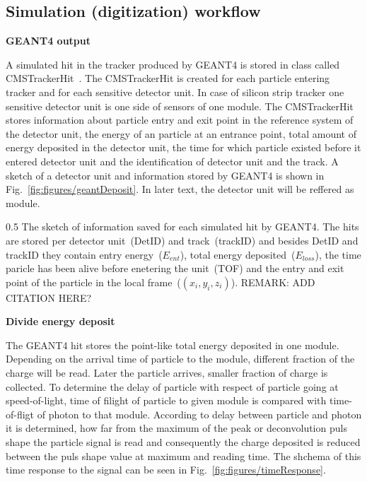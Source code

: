 \subsection{Simulation (digitization) workflow}


\textbf{GEANT4 output}

A simulated hit in the tracker produced by GEANT4 is stored in class called CMSTrackerHit~\cite{Lefebure:1364020}. The CMSTrackerHit is created for each particle entering tracker and for each sensitive detector unit. In case of silicon strip tracker one sensitive detector unit is one side of sensors of one module. The CMSTrackerHit stores information about particle entry and exit point in the reference system of the detector unit, the energy of an particle at an entrance point, total amount of energy deposited in the detector unit, the time for which particle existed before it entered detector unit and the identification of detector unit and the track. A sketch of a detector unit and information stored by GEANT4 is shown in Fig.~\ref{fig:figures/geantDeposit}. In later text, the detector unit will be reffered as module.

                 {0.5}       %
                 { The sketch of information saved for each simulated hit by GEANT4. The hits are stored per detector unit~(DetID) and track~(trackID) and besides DetID and trackID they contain entry energy~($E_{ent}$), total energy deposited~($E_{loss}$), the time paricle has been alive before enetering the unit~(TOF) and the entry and exit point of the particle in the local frame~($(x_{i},y_{i},z_{i})$). REMARK: ADD CITATION HERE?}

\textbf{Divide energy deposit}

The GEANT4 hit stores the point-like total energy deposited in one module. Depending on the arrival time of particle to the module, different fraction of the charge will be read. Later the particle arrives, smaller fraction of charge is collected. To determine the delay of particle with respect of particle going at speed-of-light, time of filight of particle to given module is compared with time-of-fligt of photon to that module. According to delay between particle and photon it is determined, how far from the maximum of the  peak or deconvolution puls shape the particle signal is read and consequently the charge deposited is reduced between the puls shape value at maximum and reading time. The shchema of this time response to the signal can be seen in Fig.~\ref{fig:figures/timeResponse}.


